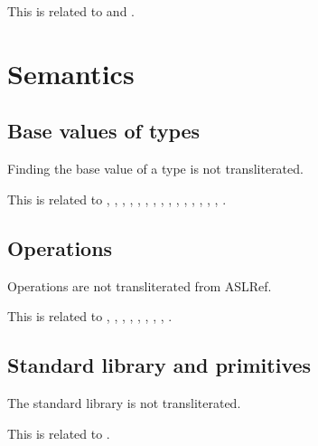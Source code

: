 \documentclass{book}
\begin{document}
This is related to  and .

\section{Semantics}

\subsection{Base values of types}

Finding the base value of a type is not transliterated.

This is related to , , , ,
, , , , ,
, , , , ,
, .

\subsection{Operations}

Operations are not transliterated from ASLRef.

This is related to , , , ,
, , , , .

\subsection{Standard library and primitives}

The standard library is not transliterated.

This is related to .
\end{document}
